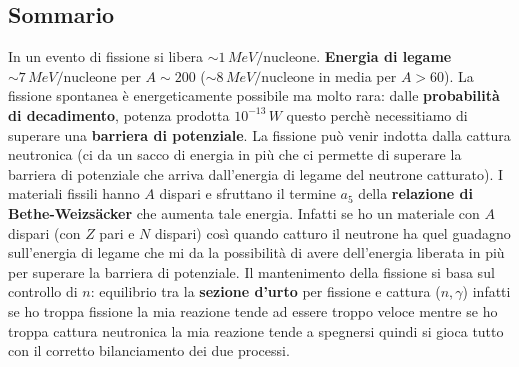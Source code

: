 \subsection{Sommario}
In un evento di fissione si libera $\sim1\,MeV/\text{nucleone}$. \textbf{Energia di legame} $\sim7\, MeV/\text{nucleone}$ per $A\sim200$ ($\sim8\,MeV/\text{nucleone}$ in media per $A>60$). La fissione spontanea è energeticamente possibile ma molto rara: dalle \textbf{probabilità di decadimento}, potenza prodotta $10^{-13}\,W$ questo perchè necessitiamo di superare una \textbf{barriera di potenziale}. La fissione può venir indotta dalla cattura neutronica (ci da un sacco di energia in più che ci permette di superare la barriera di potenziale che arriva dall'energia di legame del neutrone catturato). I materiali fissili hanno $A$ dispari e sfruttano il termine $a_5$ della \textbf{relazione di Bethe-Weizs\"acker} che aumenta tale energia. Infatti se ho un materiale con $A$ dispari (con $Z$ pari e $N$ dispari) così quando catturo il neutrone ha quel guadagno sull'energia di legame che mi da la possibilità di avere dell'energia liberata in più per superare la barriera di potenziale. Il mantenimento della fissione si basa sul controllo di $n$: equilibrio tra la \textbf{sezione d'urto} per fissione e cattura ($n,\gamma$) infatti se ho troppa fissione la mia reazione tende ad essere troppo veloce mentre se ho troppa cattura neutronica la mia reazione tende a spegnersi quindi si gioca tutto con il corretto bilanciamento dei due processi. 